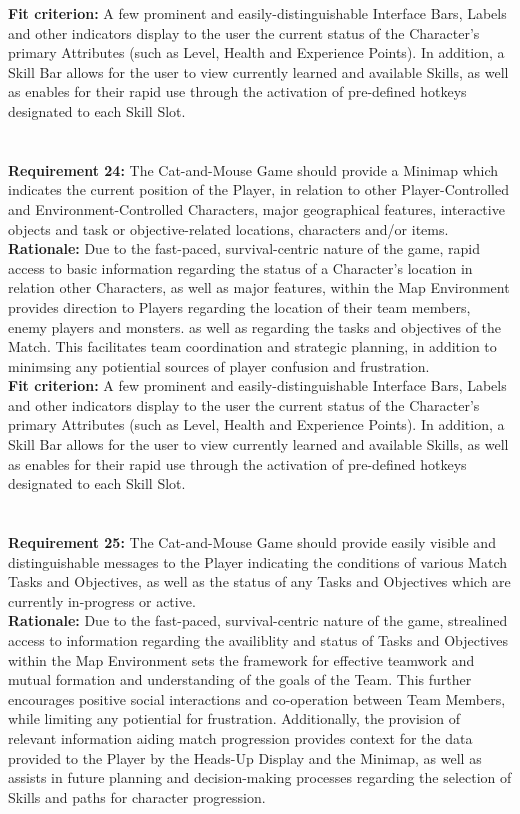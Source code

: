 \documentclass[12pt, titlepage]{article}
\begin{document}
\textbf{Fit criterion:} A few prominent and easily-distinguishable Interface Bars, Labels and other indicators display to the user the current status of the Character's primary Attributes (such as Level, Health and Experience Points). In addition, a Skill Bar allows for the user to view currently learned and available Skills, as well as enables for their rapid use through the activation of pre-defined hotkeys designated to each Skill Slot.
\\
\\
\\ \textbf{Requirement 24:}  The Cat-and-Mouse Game should provide a Minimap which indicates the current position of the Player, in relation to other Player-Controlled and Environment-Controlled Characters, major geographical features, interactive objects and task or objective-related locations, characters and/or items. \\
\textbf{Rationale:} Due to the fast-paced, survival-centric nature of the game, rapid access to basic information regarding the status of a Character's location in relation other Characters, as well as major features, within the Map Environment provides direction to Players regarding the location of their team members, enemy players and monsters. as well as  regarding the tasks and objectives of the Match. This facilitates team coordination and strategic planning, in addition to minimsing any potiential sources of player confusion and frustration. \\
\textbf{Fit criterion:} A few prominent and easily-distinguishable Interface Bars, Labels and other indicators display to the user the current status of the Character's primary Attributes (such as Level, Health and Experience Points). In addition, a Skill Bar allows for the user to view currently learned and available Skills, as well as enables for their rapid use through the activation of pre-defined hotkeys designated to each Skill Slot.
\\
\\
\\ \textbf{Requirement 25:}  The Cat-and-Mouse Game should provide easily visible and distinguishable messages to the Player indicating the conditions of various Match Tasks and Objectives, as well as the status of any Tasks and Objectives which are currently in-progress or active. \\
\textbf{Rationale:} Due to the fast-paced, survival-centric nature of the game, strealined access to information regarding the availiblity and status of Tasks and Objectives within the Map Environment sets the framework for effective teamwork and mutual formation and understanding of the goals of the Team. This further encourages positive social interactions and co-operation between Team Members, while limiting any potiential for frustration. Additionally, the provision of relevant information aiding match progression provides context for the data provided to the Player by the Heads-Up Display and the Minimap, as well as assists in future planning and decision-making processes regarding the selection of Skills and paths for character progression.  \\
\end{document}
